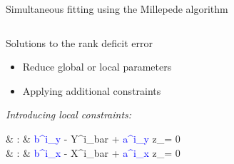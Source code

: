 \documentclass{ikpKoeln}
\begin{document}
\begin{frame}[t]{Simultaneous fitting using the Millepede algorithm}
\begin{columns}[t]
\begin{column}{0.48 \textwidth}
			\pause
			\vspace*{-1em}
			\begin{alertblock}{Solutions to the rank deficit error}
				\begin{itemize}
					\setlength\itemsep{0em}
					\item Reduce global or local parameters
					\item Applying additional constraints
				\end{itemize}
			\end{alertblock}
			\textit{Introducing local constraints:}
			\begin{flalign*}
				 & : & \textcolor{blue}{b^i_y} - Y^i_{bar} + \textcolor{blue}{a^i_y} \cdot z_\mu = 0 \\
				 & :   & \textcolor{blue}{b^i_x} - X^i_{bar} + \textcolor{blue}{a^i_x} \cdot z_\mu = 0
			\end{flalign*}
		\end{column}
	\end{columns}
\end{frame}
\end{document}
